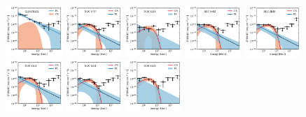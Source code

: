 \documentclass[doublespace,nopageskip]{VTthesis}
\begin{document}
\begin{appendices}
\begin{figure}
\includegraphics[width=0.19\textwidth]{Figures/Globular/spectra/2comp_2.pdf}
\includegraphics[width=0.19\textwidth]{Figures/Globular/spectra/2comp_23.pdf}
\includegraphics[width=0.19\textwidth]{Figures/Globular/spectra/2comp_10.pdf}
\includegraphics[width=0.19\textwidth]{Figures/Globular/spectra/2comp_17.pdf}
\includegraphics[width=0.19\textwidth]{Figures/Globular/spectra/2comp_5.pdf}
\includegraphics[width=0.19\textwidth]{Figures/Globular/spectra/2comp_9.pdf}
\includegraphics[width=0.19\textwidth]{Figures/Globular/spectra/2comp_25.pdf}
\includegraphics[width=0.19\textwidth]{Figures/Globular/spectra/2comp_12.pdf}

\end{figure}
\end{appendices}
\end{document}
